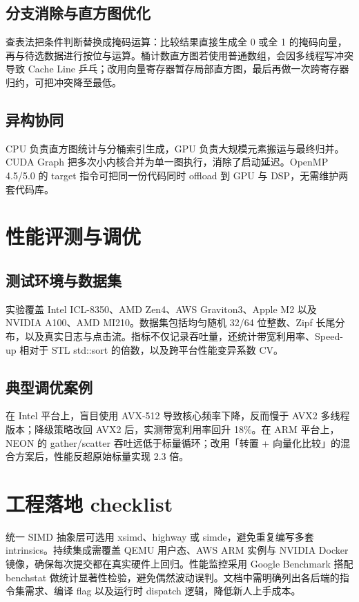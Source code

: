 \section{分支消除与直方图优化}
查表法把条件判断替换成掩码运算：比较结果直接生成全 0 或全 1 的掩码向量，再与待选数据进行按位与运算。桶计数直方图若使用普通数组，会因多线程写冲突导致 Cache Line 乒乓；改用向量寄存器暂存局部直方图，最后再做一次跨寄存器归约，可把冲突降至最低。\par
\section{异构协同}
CPU 负责直方图统计与分桶索引生成，GPU 负责大规模元素搬运与最终归并。CUDA Graph 把多次小内核合并为单一图执行，消除了启动延迟。OpenMP 4.5/5.0 的 target 指令可把同一份代码同时 offload 到 GPU 与 DSP，无需维护两套代码库。\par
\chapter{性能评测与调优}
\section{测试环境与数据集}
实验覆盖 Intel ICL-8350、AMD Zen4、AWS Graviton3、Apple M2 以及 NVIDIA A100、AMD MI210。数据集包括均匀随机 32/64 位整数、Zipf 长尾分布，以及真实日志与点击流。指标不仅记录吞吐量，还统计带宽利用率、Speed-up 相对于 STL std::sort 的倍数，以及跨平台性能变异系数 CV。\par
\section{典型调优案例}
在 Intel 平台上，盲目使用 AVX-512 导致核心频率下降，反而慢于 AVX2 多线程版本；降级策略改回 AVX2 后，实测带宽利用率回升 18\%{}。在 ARM 平台上，NEON 的 gather/scatter 吞吐远低于标量循环；改用「转置 + 向量化比较」的混合方案后，性能反超原始标量实现 2.3 倍。\par
\chapter{工程落地 checklist}
统一 SIMD 抽象层可选用 xsimd、highway 或 simde，避免重复编写多套 intrinsics。持续集成需覆盖 QEMU 用户态、AWS ARM 实例与 NVIDIA Docker 镜像，确保每次提交都在真实硬件上回归。性能监控采用 Google Benchmark 搭配 benchstat 做统计显著性检验，避免偶然波动误判。文档中需明确列出各后端的指令集需求、编译 flag 以及运行时 dispatch 逻辑，降低新人上手成本。\par
